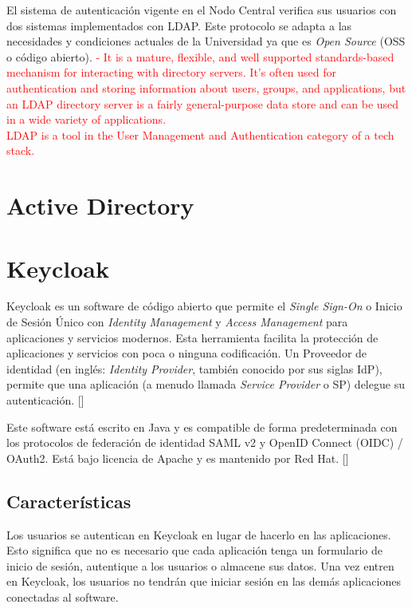 El sistema de autenticación vigente en el Nodo Central verifica sus usuarios con dos sistemas implementados con LDAP. Este protocolo se adapta a las necesidades y condiciones actuales de la Universidad ya que es \textit{Open Source} (OSS o código abierto).
\textcolor{red}{
	- It is a mature, flexible, and well supported standards-based mechanism for interacting with directory servers. It’s often used for authentication and storing information about users, groups, and applications, but an LDAP directory server is a fairly general-purpose data store and can be used in a wide variety of applications. \\ LDAP is a tool in the User Management and Authentication category of a tech stack.}


\section{Active Directory}


\section{Keycloak}
Keycloak es un software de código abierto que permite el \textit{Single Sign-On} o Inicio de Sesión Único con \textit{Identity Management} y \textit{Access Management} para aplicaciones y servicios modernos. Esta herramienta facilita la protección de aplicaciones y servicios con poca o ninguna codificación. Un Proveedor de identidad (en inglés: \textit{Identity Provider}, también conocido por sus siglas IdP), permite que una aplicación (a menudo llamada \textit{Service Provider} o SP) delegue su autenticación. [\cite{KeycloakDoc}]

Este software está escrito en Java y es compatible de forma predeterminada con los protocolos de federación de identidad SAML v2 y OpenID Connect (OIDC) / OAuth2. Está bajo licencia de Apache y es  mantenido por Red Hat. [\cite{KeycloakDoc}]

	\subsection{Características}
	Los usuarios se autentican en Keycloak en lugar de hacerlo en las aplicaciones. Esto significa que no es necesario que cada aplicación tenga un formulario de inicio de sesión, autentique a los usuarios o almacene sus datos. Una vez entren en Keycloak, los usuarios no tendrán que iniciar sesión en las demás aplicaciones conectadas al software.
	
